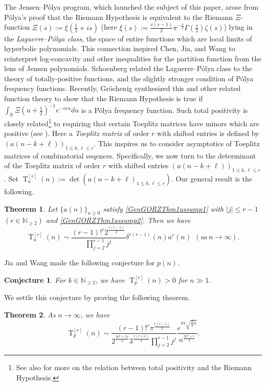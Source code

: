 \documentclass[11pt,reqno,a4paper]{amsart}
\newcommand{\R}{\mathbb{R}}
\renewcommand{\d}{{\delta}}
\newcommand{\z}{\zeta}
\renewcommand{\(}{\left\(}
\renewcommand{\)}{\right\)}
\numberwithin{equation}{section}
\theoremstyle{plain}
\newtheorem{theorem}{Theorem}[section]
\theoremstyle{definition} %
\newcounter{specialstatement}
\newtheorem{conjecture}[specialstatement]{Conjecture}
\numberwithin{equation}{section}
\begin{document}
	The Jensen--P\'olya program, which launched the subject of this paper, arose from P\'olya's proof that the Riemann Hypothesis is equivalent to the Riemann $\Xi$-function $\Xi(s)\!:=\xi(\frac 12+is)$ (here $\xi(s):=\frac{s(s-1)}{2}\pi^{-\frac s2}\Gamma(\frac s2)\z(s)$) lying in the {\it Laguerre}--{\it P\'olya class}, the space of entire functions which are  local limits of hyperbolic polynomials.  This connection inspired Chen, Jia, and Wang to reinterpret log-concavity and other inequalities for the partition function from the lens of Jensen polynomials.
	Schoenberg \cite{Schoenberg} related the Laguerre--P\'olya class to the theory of totally-positive functions, and the slightly stronger condition of P\'olya frequency functions. Recently, Gröchenig \cite{Groechenig} synthesized this and other related function theory to show that the Riemann Hypothesis is true if $\int_\R\Xi(u+\frac 12)^{-1}e^{-ixu}du$ is a P\'olya frequency function. Such total positivity is  closely related\footnote{See also \cite{Katkova, Nuttall} for more on the relation between total positivity and the Riemann Hypothesis.} to requiring that certain Toeplitz matrices have minors which are positive (see \cite{Groechenig}). Here a {\it Toeplitz matrix} of order $r$ with shifted entries is defined by $(a(n-k+\ell))_{1\le k,\ell \le r}$. This inspires us to consider asymptotics of Toeplitz matrices of combinatorial seqences.  Specifically, we now turn to the determinant of the Toeplitz matrix of order $r$ with shifted entries $(a(n-k+\ell))_{1\le k,\ell \le r}$. Set $\operatorname{T}^{[r]}_a(n):=\det(a(n-k+\ell)_{1\le k,\ell\le r})$. Our general result is the following. 
\begin{theorem}\label{detthm}
	Let $\{a(n)\}_{n\ge 0}$ satisfy {\rm{\ref{GenGORZThm1assump1}}} with $|j|\le r-1$ $(r\in \mathbb{N}_{\ge 2})$ and {\rm{\ref{GenGORZThm1assump2}}}. 
	Then we have %
	\[
	\operatorname{T}^{[r]}_a(n)\sim \frac{(r-1)!^r2^{\frac{r(r-1)}{2}}}{\prod_{j=2}^{r-1}j^{j}}\d^{r(r-1)}(n)a^{r}(n)\ \ (\text{as}\ n\to \infty). 
	\]
\end{theorem}
Jia and Wang \cite[Conjecture 1.7]{JiaWang} made the following conjecture for $p(n)$.
\begin{conjecture}\label{Detconj1}
{\it 	For $k\in \mathbb{N}_{\ge 2}$, we have $\operatorname{T}^{[r]}_p(n)>0$ for $n\!\gg\!1$}.	
\end{conjecture}
We settle this conjecture by proving the following theorem.
\begin{theorem}\label{detpn}
	As $n\to \infty$, we have 
	\[
	\operatorname{T}^{[r]}_{p}(n)\sim %
	\frac{(r-1)!^r\pi^{\frac{r(r-1)}{2}}}{2^{\frac{3r^2+5r}{4}}3^{\frac{r(r+1)}{4}}\prod_{j=2}^{r-1}j^{j}}\frac{e^{\pi r\sqrt{\frac{2}{3}n}}}{n^{\frac{3r^2+r}{4}}}.
	\]
\end{theorem}
\end{document}
